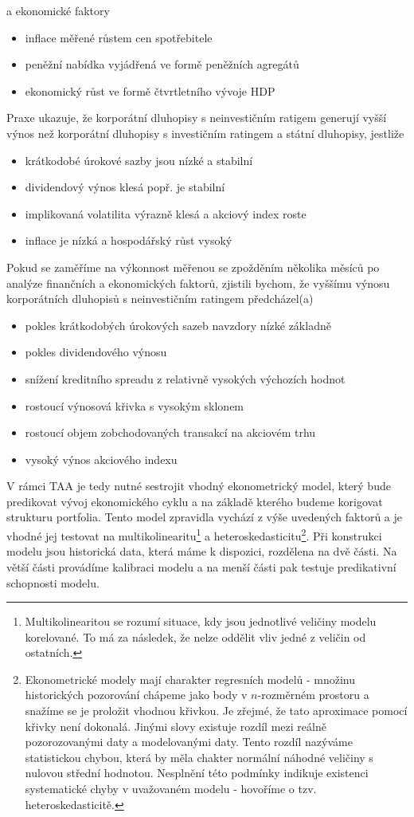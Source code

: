 \documentclass[a4paper]{book}
\begin{document}
a ekonomické faktory
\begin{itemize}
\item inflace měřené růstem cen spotřebitele
\item peněžní nabídka vyjádřená ve formě peněžních agregátů
\item ekonomický růst ve formě čtvrtletního vývoje HDP
\end{itemize}
Praxe ukazuje, že korporátní dluhopisy s neinvestičním ratigem generují vyšší výnos než korporátní dluhopisy s investičním ratingem a státní dluhopisy, jestliže
\begin{itemize}
\item krátkodobé úrokové sazby jsou nízké a stabilní
\item dividendový výnos klesá popř. je stabilní
\item implikovaná volatilita výrazně klesá a akciový index roste
\item inflace je nízká a hospodářský růst vysoký
\end{itemize}
Pokud se zaměříme na výkonnost měřenou se zpožděním několika měsíců po analýze finančních a ekonomických faktorů, zjistili bychom, že vyššímu výnosu korporátních dluhopisů s neinvestičním ratingem předcházel(a)
\begin{itemize}
\item pokles krátkodobých úrokových sazeb navzdory nízké základně 
\item pokles dividendového výnosu
\item snížení kreditního spreadu z relativně vysokých výchozích hodnot
\item rostoucí výnosová křivka s vysokým sklonem
\item rostoucí objem zobchodovaných transakcí na akciovém trhu
\item vysoký výnos akciového indexu
\end{itemize}
V rámci TAA je tedy nutné sestrojit vhodný ekonometrický model, který bude predikovat vývoj ekonomického cyklu a na základě kterého budeme korigovat strukturu portfolia. Tento model zpravidla vychází z výše uvedených faktorů a je vhodné jej testovat na multikolinearitu\footnote{Multikolinearitou se rozumí situace, kdy jsou jednotlivé veličiny modelu korelované. To má za následek, že nelze oddělit vliv jedné z veličin od ostatních.} a heteroskedasticitu\footnote{Ekonometrické modely mají charakter regresních modelů - množinu historických pozorování chápeme jako body v $n$-rozměrném prostoru a snažíme se je proložit vhodnou křivkou. Je zřejmé, že tato aproximace pomocí křivky není dokonalá. Jinými slovy existuje rozdíl mezi reálně pozorozovanými daty a modelovanými daty. Tento rozdíl nazýváme statistickou chybou, která by měla chakter normální náhodné veličiny s nulovou střední hodnotou. Nesplnění této podmínky indikuje existenci systematické chyby v uvažovaném modelu - hovoříme o tzv. heteroskedasticitě.}. Při konstrukci modelu jsou historická data, která máme k dispozici, rozdělena na dvě části. Na větší části provádíme kalibraci modelu a na menší části pak testuje predikativní schopnosti modelu.
\end{document}
